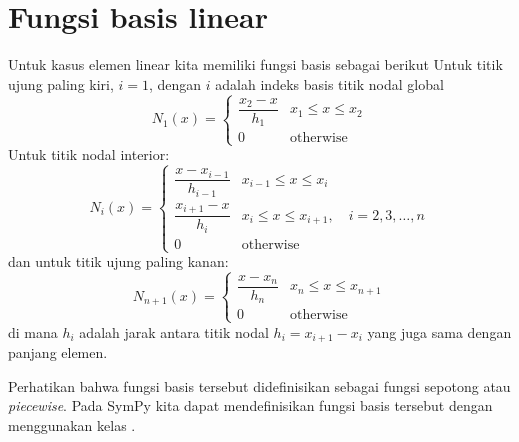 \section{Fungsi basis linear}

Untuk kasus elemen linear kita memiliki fungsi basis sebagai berikut
Untuk titik ujung paling kiri, $i=1$, dengan $i$ adalah indeks basis titik nodal global
\begin{equation}
N_{1}(x) = \begin{cases}
\dfrac{x_{2} - x}{h_1} & x_{1} \leq x \leq x_{2} \\[10pt]
0 & \text{otherwise}
\end{cases}
\end{equation}
%
Untuk titik nodal interior:
\begin{equation}
N_{i}(x) = \begin{cases}
\dfrac{x - x_{i-1}}{h_{i-1}} & x_{i-1} \leq x \leq x_{i} \\[10pt]
\dfrac{x_{i+1} - x}{h_{i}} & x_{i} \leq x \leq x_{i+1},\quad i=2,3,\ldots,n \\[10pt]
0 & \text{otherwise}
\end{cases}
\end{equation}
%
dan untuk titik ujung paling kanan:
\begin{equation}
N_{n+1}(x) = \begin{cases} \dfrac{x - x_{n}}{h_{n}} & x_{n} \leq x \leq x_{n+1} \\[10pt]
0 & \text{otherwise}
\end{cases}
\end{equation}
di mana $h_{i}$ adalah jarak antara titik nodal
$h_{i} = x_{i+1} - x_{i}$ yang juga sama dengan panjang elemen.

Perhatikan bahwa fungsi basis tersebut didefinisikan sebagai fungsi sepotong
atau \textit{piecewise}.
Pada SymPy kita dapat mendefinisikan fungsi basis tersebut dengan menggunakan kelas
.


